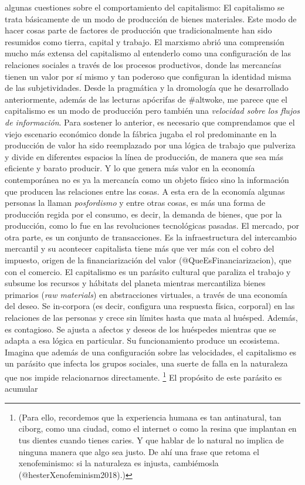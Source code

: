 \documentclass[
]{article}
\begin{document}
algunas cuestiones sobre el comportamiento del capitalismo: El
capitalismo se trata básicamente de un modo de producción de bienes
materiales. Este modo de hacer cosas parte de factores de producción que
tradicionalmente han sido resumidos como tierra, capital y trabajo. El
marxismo abrió una comprensión mucho más extensa del capitalismo al
entenderlo como una configuración de las relaciones sociales a través de
los procesos productivos, donde las mercancías tienen un valor por sí
mismo y tan poderoso que configuran la identidad misma de las
subjetividades. Desde la pragmática y la dromología que he desarrollado
anteriormente, además de las lecturas apócrifas de \#altwoke, me parece
que el capitalismo es un modo de producción pero también una
\emph{velocidad sobre los flujos de información}. Para sostener lo
anterior, es necesario que comprendamos que el viejo escenario económico
donde la fábrica jugaba el rol predominante en la producción de valor ha
sido reemplazado por una lógica de trabajo que pulveriza y divide en
diferentes espacios la línea de producción, de manera que sea más
eficiente y barato producir. Y lo que genera más valor en la economía
contemporánea no es ya la mercancía como un objeto físico sino la
información que producen las relaciones entre las cosas. A esta era de
la economía algunas personas la llaman \emph{posfordismo} y entre otras
cosas, es más una forma de producción regida por el consumo, es decir,
la demanda de bienes, que por la producción, como lo fue en las
revoluciones tecnológicas pasadas. El mercado, por otra parte, es un
conjunto de transacciones. Es la infraestructura del intercambio
mercantil y su acontecer capitalista tiene más que ver más con el cobro
del impuesto, origen de la financiarización del valor
(@QueEsFinanciarizacion), que con el comercio. El capitalismo es un
parásito cultural que paraliza el trabajo y subsume los recursos y
hábitats del planeta mientras mercantiliza bienes primarios (\emph{raw
materials}) en abstracciones virtuales, a través de una economía del
deseo. Se in-corpora (es decir, configura una respuesta física,
corporal) en las relaciones de las personas y crece sin límites hasta
que mata al huésped. Además, es contagioso. Se ajusta a afectos y deseos
de los huéspedes mientras que se adapta a esa lógica en particular. Su
funcionamiento produce un ecosistema. Imagina que además de una
configuración sobre las velocidades, el capitalismo es un parásito que
infecta los grupos sociales, una suerte de falla en la naturaleza que
nos impide relacionarnos directamente. \footnote{(Para ello, recordemos
  que la experiencia humana es tan antinatural, tan ciborg, como una
  ciudad, como el internet o como la resina que implantan en tus dientes
  cuando tienes caries. Y que hablar de lo natural no implica de ninguna
  manera que algo sea justo. De ahí una frase que retoma el
  xenofeminismo: si la naturaleza es injusta, cambiémosla
  (@hesterXenofeminism2018).)} El propósito de este parásito es acumular
\end{document}
